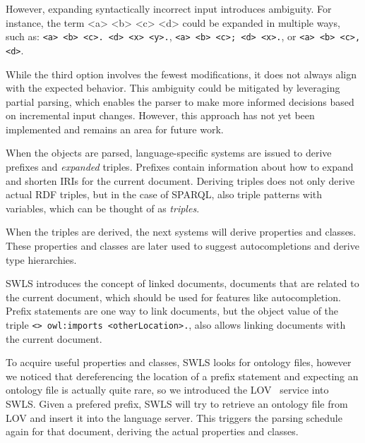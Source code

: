 However, expanding syntactically incorrect input introduces ambiguity.
For instance, the term <a> <b> <c> <d> could be expanded in multiple ways, such as: \texttt{<a> <b> <c>. <d> <x> <y>.}, \texttt{<a> <b> <c>; <d> <x>.}, or \texttt{<a> <b> <c>, <d>}.

While the third option involves the fewest modifications, it does not always align with the expected behavior.
This ambiguity could be mitigated by leveraging partial parsing, which enables the parser to make more informed decisions based on incremental input changes.
However, this approach has not yet been implemented and remains an area for future work.

When the objects are parsed, language-specific systems are issued to derive prefixes and \textit{expanded} triples. 
Prefixes contain information about how to expand and shorten IRIs for the current document.
Deriving triples does not only derive actual RDF triples, but in the case of SPARQL, also triple patterns with variables, which can be thought of as \textit{triples}.

When the triples are derived, the next systems will derive properties and classes.
These properties and classes are later used to suggest autocompletions and derive type hierarchies.

SWLS introduces the concept of linked documents, documents that are related to the current document, which should be used for features like autocompletion.
Prefix statements are one way to link documents, but the object value of the triple \texttt{<> owl:imports <otherLocation>.}, also allows linking documents with the current document.

To acquire useful properties and classes, SWLS looks for ontology files, however we noticed that dereferencing the location of a prefix statement and expecting an ontology file is actually quite rare, 
so we introduced the LOV~\cite{LOV2017} service into SWLS.
Given a prefered prefix, SWLS will try to retrieve an ontology file from LOV and insert it into the language server.
This triggers the parsing schedule again for that document, deriving the actual properties and classes.

